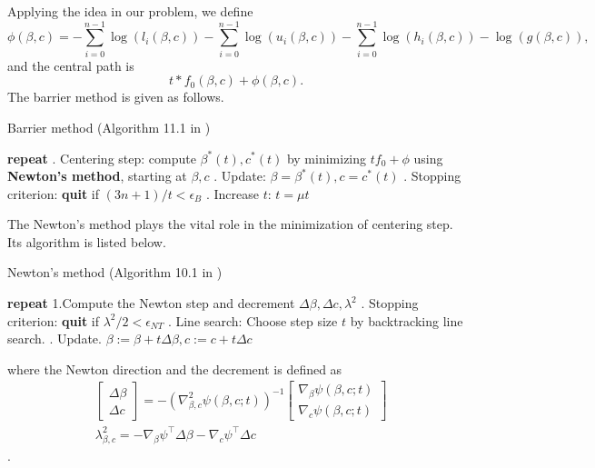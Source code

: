 \documentclass[final,onefignum,onetabnum]{siamart190516}
\begin{document}
Applying the idea in our problem, we define
\begin{equation}
    \phi(\beta, c) = -\sum_{i=0}^{n-1} \log (l_i(\beta, c)) - \sum_{i=0}^{n-1} \log (u_i(\beta, c)) - \sum_{i=0}^{n-1}\log (h_i(\beta, c)) -\log (g(\beta, c)),
\end{equation}
and the central path is
\begin{equation}
    t*f_0(\beta,c)+\phi(\beta,c).
\end{equation}
The barrier method is given as follows.
\begin{algorithm}[H]
\caption{Barrier method (Algorithm 11.1 in \cite{boyd2004convex})}
\label{alg: barrier method}
\begin{algorithmic}
\STATE \textbf{repeat}
. Centering step: compute $\beta^*(t), c^*(t)$ by minimizing $tf_0+\phi$ using \textbf{Newton's method}, starting at $\beta, c$
. Update: $\beta = \beta^*(t), c = c^*(t)$
. Stopping criterion: \textbf{quit} if $(3n+1)/t<\epsilon_B$
. Increase $t$: $t = \mu t$
\end{algorithmic}
\end{algorithm}
The Newton's method\cite{boyd2004convex} plays the vital role in the minimization of centering step. Its algorithm is listed below.
\begin{algorithm}[H]
\caption{Newton's method (Algorithm 10.1 in \cite{boyd2004convex})}
\label{alg: newton's method}
\begin{algorithmic}
\STATE \textbf{repeat}
\STATE 1.Compute the Newton step and decrement $\Delta \beta, \Delta c, \lambda^2$
. Stopping criterion: \textbf{quit} if $\lambda^2/2<\epsilon_{NT}$
. Line search: Choose step size $t$ by backtracking line search.
. Update. $\beta := \beta + t\Delta\beta, c:=c+t\Delta c$
\end{algorithmic}
\end{algorithm}
where the Newton direction and the decrement is defined as
\begin{equation}\label{DeltaNTdef}
    \begin{aligned}
    &\begin{bmatrix}
    \Delta \beta\\
    \Delta c
    \end{bmatrix} = -(\nabla^2_{\beta,c} \psi(\beta,c;t))^{-1}
    \begin{bmatrix}
    \nabla_{\beta}\psi(\beta,c;t)\\
    \nabla_c\psi(\beta,c;t)
    \end{bmatrix}\\
    & \lambda_{\beta, c}^2 = -\nabla_{\beta} \psi^{\top}\Delta\beta - \nabla_{c} \psi^{\top}\Delta c
    \end{aligned}
\end{equation}.
\end{document}
